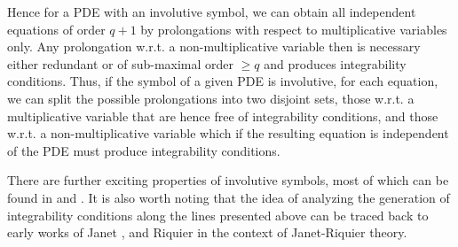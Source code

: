 Hence for a PDE with an involutive symbol, we can obtain all independent equations of order $q+1$ by prolongations with respect to multiplicative variables only. Any prolongation w.r.t. a non-multiplicative variable then is necessary either redundant or of sub-maximal order $\geq q$ and produces integrability conditions. 
Thus, if the symbol of a given PDE is involutive, for each equation, we can split the possible prolongations into two disjoint sets, those w.r.t. a multiplicative variable that are hence free of integrability conditions, and those w.r.t. a non-multiplicative variable which if the resulting equation is independent of the PDE must produce integrability conditions.

There are further exciting properties of involutive symbols, most of which can be found in \cite{seiler2009involution} and \cite{seiler2009involution}. It is also worth noting that the idea of analyzing the generation of integrability conditions along the lines presented above can be traced back to early works of Janet \cite{janet1920systemes}, \cite{MSM_1927__21__1_0} and Riquier \cite{bateman_1910} in the context of Janet-Riquier theory.

